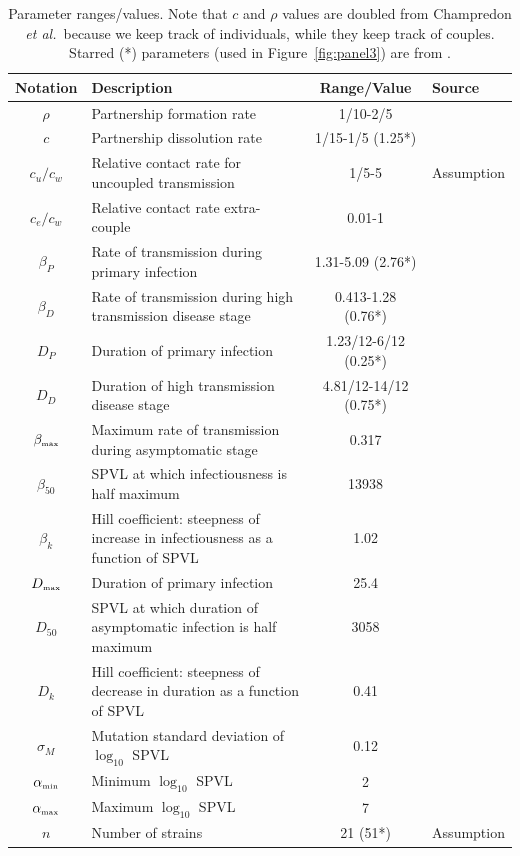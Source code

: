\documentclass[10pt,letterpaper]{article}
\newcommand{\etal}{\textit{et al.}}
\newcommand{\tsub}[2]{#1_{{\textrm{\tiny #2}}}}
\begin{document}
\begin{table}[h!]
\caption{Parameter ranges/values.  Note that $c$ and $\rho$ values are doubled from Champredon \etal\  because we keep track of individuals, while they keep track of couples. Starred (*) parameters (used in Figure~\ref{fig:panel3}) are from \cite{shirreff_transmission_2011}.}
\centering
\begin{tabular}{c p{2in} c l}
\hline 
Notation & Description & Range/Value & Source\\
\hline %
$\rho$ & Partnership formation rate & 1/10-2/5 & \cite{champredon_hiv_2013} \\
$c$ & Partnership dissolution rate & 1/15-1/5 (1.25*) & \cite{champredon_hiv_2013} \\
$c_u/c_w$ & Relative contact rate for uncoupled transmission & 1/5-5 & Assumption \\
$c_e/c_w$ & Relative contact rate extra-couple & 0.01-1 & \cite{champredon_hiv_2013} \\
$\beta_P$ & Rate of transmission during primary infection & 1.31-5.09 (2.76*) & \cite{hollingsworth_hiv1_2008} \\
$\beta_D$ & Rate of transmission during high transmission disease stage & 0.413-1.28 (0.76*) & \cite{hollingsworth_hiv1_2008} \\
$D_P$ & Duration of primary infection & 1.23/12-6/12 (0.25*) & \cite{hollingsworth_hiv1_2008,shirreff_transmission_2011} \\
$D_D$ & Duration of high transmission disease stage & 4.81/12-14/12 (0.75*) & \cite{hollingsworth_hiv1_2008} \\
$\tsub{\beta}{max}$ & Maximum rate of transmission during asymptomatic stage & 0.317 & \cite{shirreff_transmission_2011} \\
$\beta_{50}$ & SPVL at which infectiousness is half maximum & 13938 & \cite{shirreff_transmission_2011} \\
$\beta_k$ & Hill coefficient: steepness of increase in infectiousness as a function of SPVL & 1.02 & \cite{shirreff_transmission_2011} \\
$\tsub{D}{max}$ & Duration of primary infection & 25.4 & \cite{shirreff_transmission_2011} \\
$D_{50}$ & SPVL at which duration of asymptomatic infection is half maximum & 3058 & \cite{shirreff_transmission_2011} \\
$D_{k}$ & Hill coefficient: steepness of decrease in duration as a function of SPVL & 0.41 & \cite{shirreff_transmission_2011} \\
$\sigma_M$ & Mutation standard deviation of $\log_{10}$ SPVL & 0.12 & \cite{shirreff_transmission_2011} \\
$\tsub{\alpha}{min}$ & Minimum $\log_{10}$ SPVL & 2 & \cite{shirreff_transmission_2011}\\
$\tsub{\alpha}{max}$ & Maximum $\log_{10}$ SPVL & 7 & \cite{shirreff_transmission_2011}\\
$n$ & Number of strains & 21 (51*) & Assumption\\
\hline
\end{tabular}
\label{table:parmsTable}
\end{table}
\end{document}
